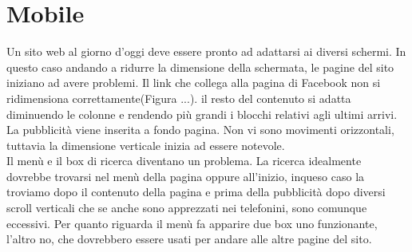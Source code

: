 \section{Mobile}
Un sito web al giorno d'oggi deve essere pronto ad adattarsi ai diversi schermi. In questo caso andando a ridurre la dimensione della schermata, le pagine del sito iniziano ad avere problemi. Il link che collega alla pagina di Facebook non si ridimensiona correttamente(Figura ...). il resto del contenuto si adatta diminuendo le colonne e rendendo più grandi i blocchi relativi agli ultimi arrivi. La pubblicità viene inserita a fondo pagina. Non vi sono movimenti orizzontali, tuttavia la dimensione verticale inizia ad essere notevole. \\
Il menù e il box di ricerca diventano un problema. La ricerca idealmente dovrebbe trovarsi nel menù della pagina oppure all'inizio, inqueso caso la troviamo dopo il contenuto della pagina e prima della pubblicità dopo diversi scroll verticali che se anche sono apprezzati nei telefonini, sono comunque eccessivi. Per quanto riguarda il menù fa apparire due box uno funzionante, l'altro no, che dovrebbero essere usati per andare alle altre pagine del sito.